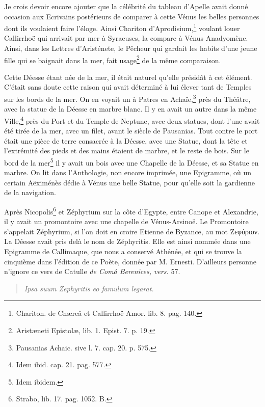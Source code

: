 \documentclass[a4paper, 11pt, oneside, polutonikogreek, french]{article}
\begin{document}
Je crois devoir encore ajouter que la célébrité du tableau d'Apelle avait donné occasion aux Ecrivains postérieurs de comparer à cette Vénus les belles personnes dont ils voulaient faire l'éloge. Ainsi Chariton d'Aprodisium,\footnote{Chariton. de Chæreâ et Callirrhoë Amor. lib. 8. pag. 140.} voulant louer Callirrhoë qui arrivait par mer à Syracuses, la compare à Vénus Anadyomène. Ainsi, dans les Lettres d'Aristénete, le Pêcheur qui gardait les habits d'une jeune fille qui se baignait dans la mer, fait usage\footnote{Aristæneti Epistolæ, lib. 1. Epist. 7. p. 19.} de la même comparaison.

Cette Déesse étant née de la mer, il était naturel qu'elle présidât à cet élément. C'était sans doute cette raison qui avait déterminé à lui élever tant de Temples sur les bords de la mer. On en voyait un à Patres en Achaïe,\footnote{Pausanias Achaic. sive l. 7. cap. 20. p. 575.} près du Théâtre, avec la statue de la Déesse en marbre blanc. Il y en avait un autre dans la même Ville,\footnote{Idem ibid. cap. 21. pag. 577.} près du Port et du Temple de Neptune, avec deux statues, dont l'une avait été tirée de la mer, avec un filet, avant le siècle de Pausanias. Tout contre le port était une pièce de terre consacrée à la Déesse, avec une Statue, dont la tête et l'extrémité des pieds et des mains étaient de marbre, et le reste de bois. Sur le bord de la mer\footnote{Idem ibidem.} il y avait un bois avec une Chapelle de la Déesse, et sa Statue en marbre. On lit dans l'Anthologie, non encore imprimée, une Epigramme, où un certain Aëximénès dédie à Vénus une belle Statue, pour qu'elle soit la gardienne de la navigation.

Après Nicopolis\footnote{Strabo, lib. 17. pag. 1052. B.} et Zéphyrium sur la côte d'Egypte, entre Canope et Alexandrie, il y avait un promontoire avec une chapelle de Vénus-Arsinoë. Le Promontoire s'appelait Zéphyrium, si l'on doit en croire Etienne de Byzance, au mot Ζεφύριον. La Déesse avait pris delà le nom de Zéphyritis. Elle est ainsi nommée dans une Epigramme de Callimaque, que nous a conservé Athénée, et qui se trouve la cinquième dans l'édition de ce Poète, donnée par M. Ernesti. D'ailleurs personne n'ignore ce vers de Catulle \emph{de Comâ Berenices, vers.} 57.
\begin{quotation}
\emph{Ipsa suum Zephyritis eo famulum legarat.}
\end{quotation}
\end{document}
